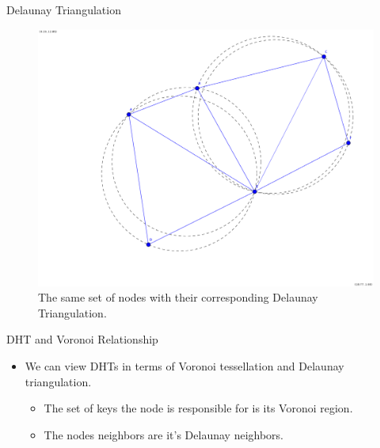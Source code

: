 \documentclass[11pt]{beamer}
\begin{document}

\begin{frame}{Delaunay Triangulation}
	\begin{figure}
		\centering
		\includegraphics[width=0.5\linewidth]{figs/delaunay}
		\caption{The same set of nodes with their corresponding Delaunay Triangulation.}
		\label{fig:delaunay}
	\end{figure}
\end{frame}



\begin{frame}{DHT and Voronoi Relationship }
	\begin{itemize}
		\item We can view DHTs in terms of Voronoi tessellation and Delaunay triangulation.
		\begin{itemize}
			\item The set of keys the node is responsible for is its Voronoi region.
			\item The nodes neighbors are it's Delaunay neighbors.
		\end{itemize}
	\end{itemize}
\end{frame}
\end{document}

